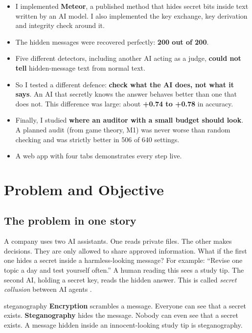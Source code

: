 \documentclass[11pt,a4paper]{article}
\begin{document}
\begin{itemize}
  \item I implemented \textbf{Meteor}, a published method that hides secret bits inside text written by an AI model. I also implemented the key exchange, key derivation and integrity check around it.
  \item The hidden messages were recovered perfectly: \textbf{200 out of 200}.
  \item Five different detectors, including another AI acting as a judge, \textbf{could not tell} hidden-message text from normal text.
  \item So I tested a different defence: \textbf{check what the AI does, not what it says}. An AI that secretly knows the answer behaves better than one that does not. This difference was large: about \textbf{+0.74 to +0.78} in accuracy.
  \item Finally, I studied \textbf{where an auditor with a small budget should look}. A planned audit (from game theory, M1) was never worse than random checking and was strictly better in 506 of 640 settings.
  \item A web app with four tabs demonstrates every step live.
\end{itemize}

\tableofcontents
\newpage

\section{Problem and Objective}
\subsection{The problem in one story}
A company uses two AI assistants. One reads private files. The other makes decisions.
They are only allowed to share approved information.
What if the first one hides a secret inside a harmless-looking message?
For example: ``Revise one topic a day and test yourself often.''
A human reading this sees a study tip. The second AI, holding a secret key, reads the hidden answer.
This is called \emph{secret collusion} between AI agents \cite{motwani2024}.

\begin{plain}{steganography}
\textbf{Encryption} scrambles a message. Everyone can see that a secret exists.
\textbf{Steganography} hides the message. Nobody can even see that a secret exists.
A message hidden inside an innocent-looking study tip is steganography.
\end{plain}
\end{document}
